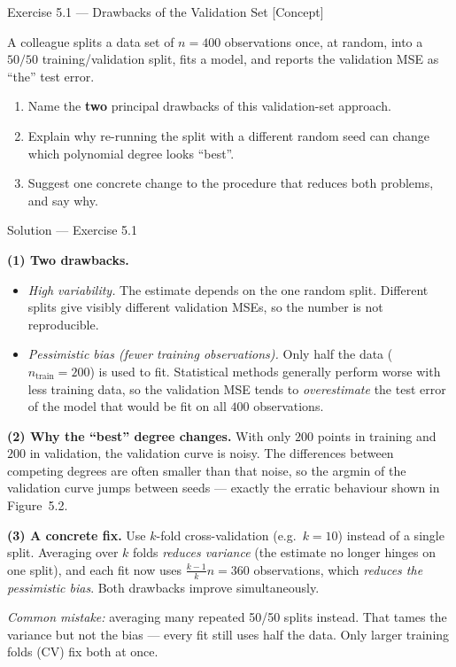 \documentclass[aspectratio=169,11pt]{beamer}
\begin{document}
\begin{frame}{Exercise 5.1 --- Drawbacks of the Validation Set [Concept]}
  \begin{exercise}
    A colleague splits a data set of $n = 400$ observations once, at
    random, into a $50/50$ training/validation split, fits a model, and
    reports the validation MSE as ``the'' test error.
    \begin{enumerate}
      \item Name the \textbf{two} principal drawbacks of this
            validation-set approach.
      \item Explain why re-running the split with a different random seed
            can change which polynomial degree looks ``best''.
      \item Suggest one concrete change to the procedure that reduces
            both problems, and say why.
    \end{enumerate}
  \end{exercise}
\end{frame}

\begin{frame}{Solution --- Exercise 5.1}
  \begin{solutionbox}
    \textbf{(1) Two drawbacks.}
    \begin{itemize}
      \item \emph{High variability.} The estimate depends on the one
            random split. Different splits give visibly different
            validation MSEs, so the number is not reproducible.
      \item \emph{Pessimistic bias (fewer training observations).} Only
            half the data ($n_\mathrm{train} = 200$) is used to fit.
            Statistical methods generally perform worse with less
            training data, so the validation MSE tends to
            \emph{overestimate} the test error of the model that would
            be fit on all $400$ observations.
    \end{itemize}
    \textbf{(2) Why the ``best'' degree changes.}
    With only $200$ points in training and $200$ in validation, the
    validation curve is noisy. The differences between competing degrees
    are often smaller than that noise, so the argmin of the validation
    curve jumps between seeds --- exactly the erratic behaviour shown in
    Figure~5.2.

    \textbf{(3) A concrete fix.}
    Use $k$-fold cross-validation (e.g.\ $k = 10$) instead of a single
    split. Averaging over $k$ folds \emph{reduces variance} (the
    estimate no longer hinges on one split), and each fit now uses
    $\tfrac{k-1}{k}n = 360$ observations, which \emph{reduces the
    pessimistic bias}. Both drawbacks improve simultaneously.

    \medskip
    \textit{Common mistake:} averaging many repeated 50/50 splits instead.
    That tames the variance but not the bias --- every fit still uses half
    the data. Only larger training folds (CV) fix both at once.
  \end{solutionbox}
\end{frame}
\end{document}
